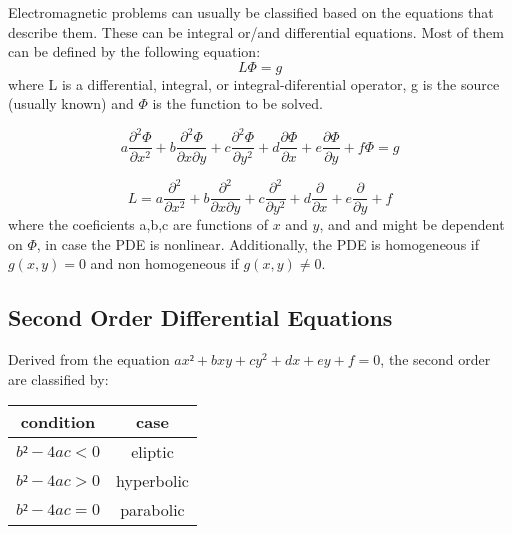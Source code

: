 \documentclass[12pt]{article}
\begin{document}
Electromagnetic problems can usually be classified based on the equations that describe them. These can be integral or/and differential equations. Most of them can be defined by the following equation:
\begin{equation}
	L \Phi = g
\end{equation}
where L is a differential, integral, or integral-diferential operator, g is the source (usually known) and $\Phi$ is the function to be solved.

\begin{equation}
	a\frac{\partial^{2}\Phi}{\partial x^{2}}+
	b\frac{\partial^{2}\Phi}{\partial x\partial y}+
	c\frac{\partial^{2}\Phi}{\partial y^{2}}+
	d\frac{\partial\Phi}{\partial x}+
	e\frac{\partial\Phi}{\partial y}+
	f\Phi=
	g
\end{equation}

\begin{equation}
	L=
	a\frac{\partial^{2}}{\partial x^{2}}+
	b\frac{\partial^{2}}{\partial x \partial y}+
	c\frac{\partial^{2}}{\partial y^{2}}+
	d\frac{\partial}{\partial x}+
	e\frac{\partial}{\partial y}+
	f
\end{equation}
where the coeficients a,b,c are functions of $x$ and $y$, and and might be dependent on $\Phi$, in case the \acrfull{PDE} is nonlinear. Additionally, the \acrshort{PDE} is homogeneous if $g(x,y) = 0$ and non homogeneous if $g(x,y) \neq 0$.

\subsection{Second Order Differential Equations}%
\label{sub:second_order_differential_equations}


Derived from the equation $a x² + b xy+ c y^{2} + d x+ e y+ f = 0$, the second order  are classified by:
\begin{table}[htpb]
	\centering
	\label{tab:second_order_pde_classification}
	\begin{tabular}{cc}
		\toprule
		condition  & case       \\
		\midrule
		$b²-4ac<0$ & eliptic    \\
		$b²-4ac>0$ & hyperbolic \\
		$b²-4ac=0$ & parabolic  \\
		\bottomrule
	\end{tabular}
\end{table}
\end{document}

